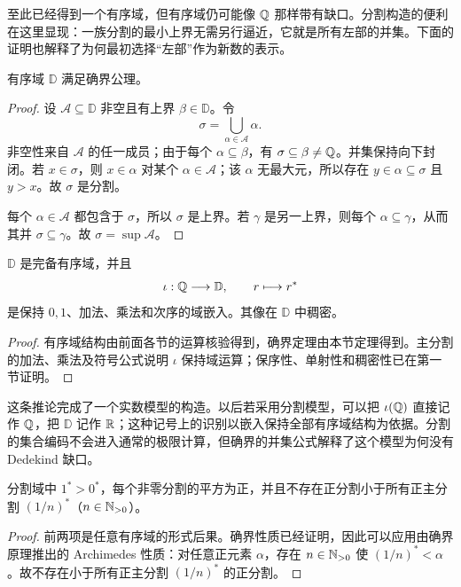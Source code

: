 至此已经得到一个有序域，但有序域仍可能像 \(\mathbb{Q}\) 那样带有缺口。分割构造的便利在这里显现：一族分割的最小上界无需另行逼近，它就是所有左部的并集。下面的证明也解释了为何最初选择“左部”作为新数的表示。


\begin{theorem}
有序域 \(\mathbb D\) 满足确界公理。
\end{theorem}

\begin{proof}
设 \(\mathcal A\subseteq\mathbb D\) 非空且有上界 \(\beta\in\mathbb D\)。令
\[
 \sigma=\bigcup_{\alpha\in\mathcal A}\alpha.
\]
非空性来自 \(\mathcal A\) 的任一成员；由于每个 \(\alpha\subseteq\beta\)，有 \(\sigma\subseteq\beta\ne\mathbb{Q}\)。并集保持向下封闭。若 \(x\in\sigma\)，则 \(x\in\alpha\) 对某个 \(\alpha\in\mathcal A\)；该 \(\alpha\) 无最大元，所以存在 \(y\in\alpha\subseteq\sigma\) 且 \(y>x\)。故 \(\sigma\) 是分割。

每个 \(\alpha\in\mathcal A\) 都包含于 \(\sigma\)，所以 \(\sigma\) 是上界。若 \(\gamma\) 是另一上界，则每个 \(\alpha\subseteq\gamma\)，从而其并 \(\sigma\subseteq\gamma\)。故 \(\sigma=\sup\mathcal A\)。
\end{proof}

\begin{corollary}
\(\mathbb D\) 是完备有序域，并且
\[
  \iota:\mathbb{Q}\longrightarrow\mathbb D,\qquad r\longmapsto r^*
\]
是保持 \(0,1\)、加法、乘法和次序的域嵌入。其像在
\(\mathbb D\) 中稠密。
\end{corollary}

\begin{proof}
有序域结构由前面各节的运算核验得到，确界定理由本节定理得到。主分割的加法、乘法及符号公式说明 \(\iota\) 保持域运算；保序性、单射性和稠密性已在第一节证明。
\end{proof}

这条推论完成了一个实数模型的构造。以后若采用分割模型，可以把
\(\iota(\mathbb{Q})\) 直接记作 \(\mathbb{Q}\)，把 \(\mathbb D\) 记作 \(\mathbb{R}\)；这种记号上的识别以嵌入保持全部有序域结构为依据。分割的集合编码不会进入通常的极限计算，但确界的并集公式解释了这个模型为何没有 Dedekind 缺口。

\begin{proposition}
分割域中 \(1^*>0^*\)，每个非零分割的平方为正，并且不存在正分割小于所有正主分割 \((1/n)^*\)（\(n\in\mathbb{N}_{>0}\)）。
\end{proposition}

\begin{proof}
前两项是任意有序域的形式后果。确界性质已经证明，因此可以应用由确界原理推出的 Archimedes 性质：对任意正元素 \(\alpha\)，存在 \(n\in\mathbb{N}_{>0}\) 使 \((1/n)^*<\alpha\)。故不存在小于所有正主分割 \((1/n)^*\) 的正分割。
\end{proof}


